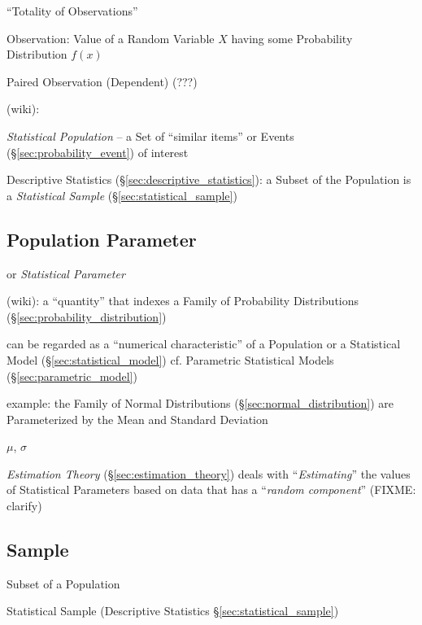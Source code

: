 ``Totality of Observations''

Observation: Value of a Random Variable $X$ having some Probability
Distribution $f(x)$

Paired Observation (Dependent) (???)

(wiki):

\emph{Statistical Population} -- a Set of ``similar items'' or Events
(\S\ref{sec:probability_event}) of interest

Descriptive Statistics (\S\ref{sec:descriptive_statistics}): a Subset of the
Population is a \emph{Statistical Sample} (\S\ref{sec:statistical_sample})



\subsection{Population Parameter}\label{sec:population_parameter}

or \emph{Statistical Parameter}

(wiki): a ``quantity'' that indexes a Family of Probability Distributions
(\S\ref{sec:probability_distribution})

can be regarded as a ``numerical characteristic'' of a Population or a
Statistical Model (\S\ref{sec:statistical_model}) \fist cf. Parametric
Statistical Models (\S\ref{sec:parametric_model})

example: the Family of Normal Distributions (\S\ref{sec:normal_distribution})
are Parameterized by the Mean and Standard Deviation

$\mu$, $\sigma$

\fist \emph{Estimation Theory} (\S\ref{sec:estimation_theory}) deals with
``\emph{Estimating}'' the values of Statistical Parameters
based on data that has a ``\emph{random component}'' (FIXME: clarify)



\subsection{Sample}\label{sec:sample}

Subset of a Population

Statistical Sample (Descriptive Statistics \S\ref{sec:statistical_sample})



